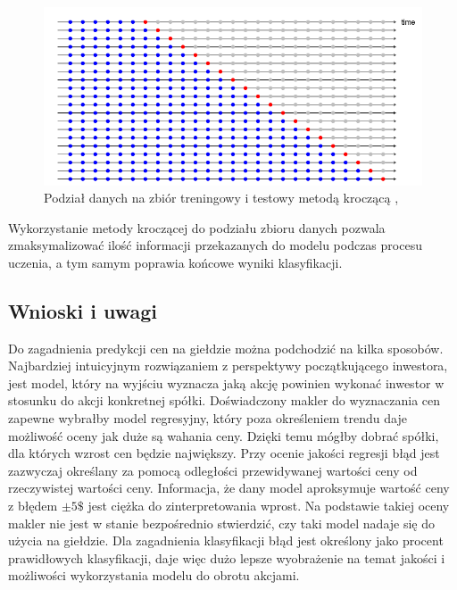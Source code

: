 \documentclass[a4paper, twoside, 11pt, openright]{article}
\begin{document}
\begin{figure}[H]
\centering 
\includegraphics[scale=0.75]{img/train_test_split_time_series.png}
\caption{Podział danych na zbiór treningowy i testowy metodą kroczącą \cite{train_test_split_time_series},}
\label{img:train_test_split_time_series}
\end{figure}

Wykorzystanie metody kroczącej do podziału zbioru danych pozwala zmaksymalizować ilość informacji przekazanych do modelu podczas procesu uczenia, a tym samym poprawia końcowe wyniki klasyfikacji. 


\subsection{Wnioski i uwagi}

Do zagadnienia predykcji cen na giełdzie można podchodzić na kilka sposobów. Najbardziej intuicyjnym rozwiązaniem z perspektywy początkującego inwestora, jest model, który na wyjściu wyznacza jaką akcję powinien wykonać inwestor w stosunku do akcji konkretnej spółki. Doświadczony makler do wyznaczania cen zapewne wybrałby model regresyjny, który poza określeniem trendu daje możliwość oceny jak duże są wahania ceny. Dzięki temu mógłby dobrać spółki, dla których wzrost cen będzie największy. Przy ocenie jakości regresji błąd jest zazwyczaj określany za pomocą odległości przewidywanej wartości ceny od rzeczywistej wartości ceny. Informacja, że dany model aproksymuje wartość ceny z błędem $\pm 5 \$$ jest ciężka do zinterpretowania wprost. Na podstawie takiej oceny makler nie jest w stanie bezpośrednio stwierdzić, czy taki model nadaje się do użycia na giełdzie. Dla zagadnienia klasyfikacji błąd jest określony jako procent prawidłowych klasyfikacji, daje więc dużo lepsze wyobrażenie na temat jakości i możliwości wykorzystania modelu do obrotu akcjami.

\bigskip
\end{document}
